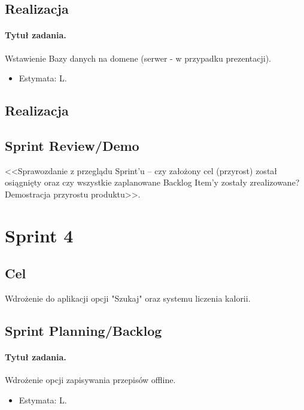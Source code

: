 \documentclass[a4paper]{article}
\begin{document}
	\subsection{Realizacja}
	
	
	\paragraph{Tytuł zadania.} Wstawienie Bazy danych na domene (serwer - w przypadku prezentacji).
	\begin{itemize}
		\item Estymata: L.
	\end{itemize}
	
	
	\subsection{Realizacja}
	
	
	
	\subsection{Sprint Review/Demo}
	<<Sprawozdanie z przeglądu Sprint'u -- czy założony cel (przyrost) został osiągnięty oraz czy wszystkie zaplanowane Backlog Item'y zostały zrealizowane? Demostracja przyrostu produktu>>.
	
	
	\section{Sprint 4}
	
	\subsection{Cel} Wdrożenie do aplikacji opcji "Szukaj" oraz systemu liczenia kalorii.
	
	\subsection{Sprint Planning/Backlog}
	
	\paragraph{Tytuł zadania.} Wdrożenie opcji zapisywania przepisów offline.
	\begin{itemize}
		\item Estymata: L.
	\end{itemize}
	
\end{document}
